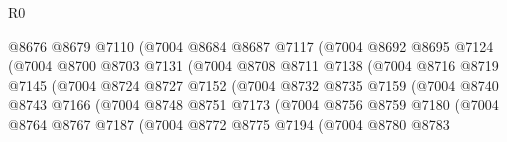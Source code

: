 \begin{lexlean}{R0}
\begin{coremodule}
                              @8676
                              @8679
                              @7110
                              (@7004
                                @8684
                                @8687
                                @7117
                                (@7004
                                  @8692
                                  @8695
                                  @7124
                                  (@7004
                                    @8700
                                    @8703
                                    @7131
                                    (@7004
                                      @8708
                                      @8711
                                      @7138
                                      (@7004
                                        @8716
                                        @8719
                                        @7145
                                        (@7004
                                          @8724
                                          @8727
                                          @7152
                                          (@7004
                                            @8732
                                            @8735
                                            @7159
                                            (@7004
                                              @8740
                                              @8743
                                              @7166
                                              (@7004
                                                @8748
                                                @8751
                                                @7173
                                                (@7004
                                                  @8756
                                                  @8759
                                                  @7180
                                                  (@7004
                                                    @8764
                                                    @8767
                                                    @7187
                                                    (@7004
                                                      @8772
                                                      @8775
                                                      @7194
                                                      (@7004
                                                        @8780
                                                        @8783

\end{coremodule}
\end{lexlean}
